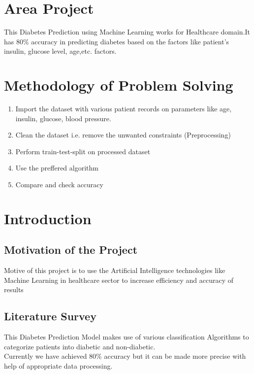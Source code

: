 \documentclass[pdftex,a4paper,11pt,oneside,openright]{report}
\begin{document}

\chapter{Area Project}
\Large{This Diabetes Prediction using Machine Learning works for Healthcare domain.It has 80\% accuracy in predicting diabetes based on the factors like patient's insulin, glucose level, age,etc. factors.  }

\chapter{Methodology of Problem Solving}
\begin{enumerate}
    \item Import the dataset with various patient records on parameters like age, insulin, glucose, blood pressure.
    \item Clean the dataset i.e. remove the unwanted constraints (Preprocessing)
    \item Perform train-test-split on processed dataset
    \item Use the preffered algorithm
    \item Compare and check accuracy
\end{enumerate}
\chapter{Introduction}
\section{Motivation of the Project}
\Large{Motive of this project is to use the Artificial Intelligence technologies like Machine Learning in healthcare sector to increase efficiency and accuracy of results }
\section{Literature Survey}
\Large{This Diabetes Prediction Model makes use of various classification Algorithms to categorize patients into diabetic and non-diabetic.}\\
\Large{Currently we have achieved 80\% accuracy but it can be made more precise with help of appropriate data processing.}
\end{document}
